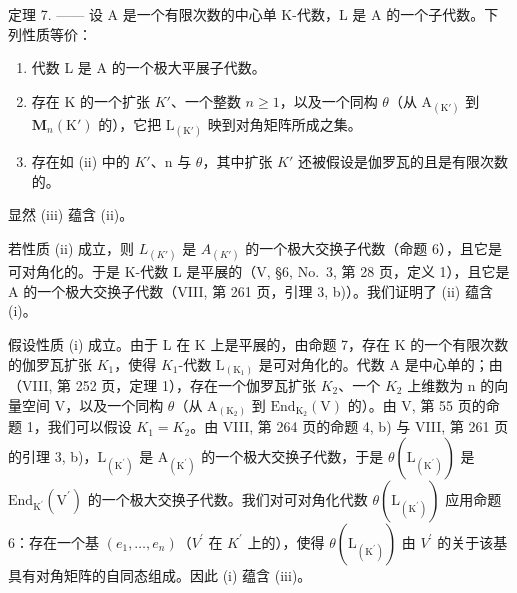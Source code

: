 定理 7. —— 设 A 是一个有限次数的中心单 K-代数，L 是 A 的一个子代数。下列性质等价：

\begin{enumerate}
\def\labelenumi{(\roman{enumi})}
\item
  代数 L 是 A 的一个极大平展子代数。
\item
  存在 K 的一个扩张 \(K'\)、一个整数 \(n \geqslant 1\)，以及一个同构 \(\theta\)（从 \(\mathrm{A}_{(\mathrm{K}')}\) 到 \(\mathbf{M}_{n}(\mathrm{K}')\) 的），它把 \(\mathrm{L}_{(\mathrm{K}')}\) 映到对角矩阵所成之集。
\item
  存在如 (ii) 中的 \(K'\)、n 与 \(\theta\)，其中扩张 \(K'\) 还被假设是伽罗瓦的且是有限次数的。
\end{enumerate}

显然 (iii) 蕴含 (ii)。

若性质 (ii) 成立，则 \(L_{(K')}\) 是 \(A_{(K')}\) 的一个极大交换子代数（命题 6），且它是可对角化的。于是 K-代数 L 是平展的（V, §6, No.~3, 第 28 页，定义 1），且它是 A 的一个极大交换子代数（VIII, 第 261 页，引理 3, b)）。我们证明了 (ii) 蕴含 (i)。

假设性质 (i) 成立。由于 L 在 K 上是平展的，由命题 7，存在 K 的一个有限次数的伽罗瓦扩张 \(K_{1}\)，使得 \(K_{1}\)-代数 \(\mathrm{L}_{(\mathrm{K}_{1})}\) 是可对角化的。代数 A 是中心单的；由（VIII, 第 252 页，定理 1），存在一个伽罗瓦扩张 \(K_{2}\)、一个 \(K_{2}\) 上维数为 n 的向量空间 V，以及一个同构 \(\theta\)（从 \(\mathrm{A}_{(\mathrm{K}_{2})}\) 到 \(\mathrm{End}_{\mathrm{K}_{2}}(\mathrm{V})\) 的）。由 V, 第 55 页的命题 1，我们可以假设 \(K_{1}=K_{2}\)。由 VIII, 第 264 页的命题 4, b) 与 VIII, 第 261 页的引理 3, b)，\(\mathrm{L}_{(\mathrm{K}^{\prime})}\) 是 \(\mathrm{A}_{(\mathrm{K}^{\prime})}\) 的一个极大交换子代数，于是 \(\theta(\mathrm{L}_{(\mathrm{K}^{\prime})})\) 是 \(\mathrm{End}_{\mathrm{K}^{\prime}}(\mathrm{V}^{\prime})\) 的一个极大交换子代数。我们对可对角化代数 \(\theta(\mathrm{L}_{(\mathrm{K}^{\prime})})\) 应用命题 6：存在一个基 \((e_{1},\ldots,e_{n})\)（\(V^{\prime}\) 在 \(K^{\prime}\) 上的），使得 \(\theta(\mathrm{L}_{(\mathrm{K}^{\prime})})\) 由 \(V^{\prime}\) 的关于该基具有对角矩阵的自同态组成。因此 (i) 蕴含 (iii)。

